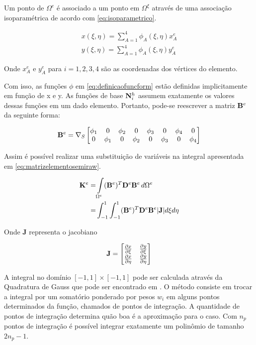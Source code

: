 Um ponto de $\Omega^e$ é associado a um ponto em $\Omega^\xi$ através de uma associação isoparamétrica de acordo com \eqref{eq:isoparametrico}.


\begin{equation}\label{eq:isoparametrico}
\begin{matrix}
x(\xi, \eta) = \sum_{A=1}^{4} \phi_A(\xi, \eta) x^e_A \\
y(\xi, \eta) = \sum_{A=1}^{4} \phi_A(\xi, \eta) y^e_A
\end{matrix}
\end{equation}

Onde $x^e_A$ e $y^e_A$ para $i=1,2,3,4$ são as coordenadas dos vértices do elemento.

Com isso, as funções $\phi$ em \eqref{eq:definicaofuncform} estão definidas implicitamente em função de x e y. As funções de base ${\mathbf{N}_{i}^h}$ assumem exatamente os valores dessas funções em um dado elemento. Portanto, pode-se reescrever a matriz $\mathbf{B}^e$ da seguinte forma:


\begin{equation} \label{eq:bephi}
    \mathbf{B}^e = \nabla_S \begin{bmatrix}
\phi_1 & 0      & \phi_2 & 0 & \phi_3 & 0 & \phi_4 & 0\\
0      & \phi_1 & 0 & \phi_2 & 0 & \phi_3 & 0 & \phi_4
\end{bmatrix}
\end{equation}


Assim é possível realizar uma substituição de variáveis na integral apresentada em \eqref{eq:matrizelementosemiraw}.


\begin{align}
\mathbf{K}^e      = & \int\limits_{\Omega^e}  (\mathbf{B}^e)^T \mathbf{D}^e \mathbf{B}^e \, d\Omega^e \nonumber \\
         = &  \int_{-1}^{1}\int_{-1}^{1}  (\mathbf{B}^e)^T \mathbf{D}^e \mathbf{B}^e |\mathbf{J}|   d\xi d\eta
\end{align}


Onde $\mathbf{J}$ representa o jacobiano

\begin{equation}
\mathbf{J} = \begin{bmatrix}
\dxi[x]   &  \dxi[y]    \\
\deta[x]  &  \deta[y]
\end{bmatrix}
\label{eq:jacobiano}
\end{equation}


A integral no domínio $[-1, 1] \times [-1,1] $ pode ser calculada através da Quadratura de Gauss que pode ser encontrado em \cite{jacob}. O método consiste em trocar a integral por um somatório ponderado por pesos $w_i$ em alguns pontos determinados da função, chamados de pontos de integração. A quantidade de pontos de integração determina quão boa é a aproximação para o caso. Com $n_p$ pontos de integração é possível integrar exatamente um
polinômio de tamanho $2n_p - 1$. %

